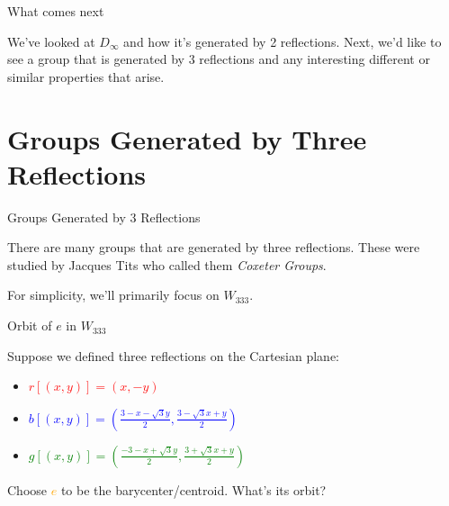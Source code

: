 \documentclass[usenames,dvipsnames]{beamer}
\begin{document}
\begin{frame}{What comes next}

We've looked at $D_\infty$ and how it's generated by 2 reflections. Next, we'd like to see a group that is
generated by 3 reflections and any interesting different or similar properties that arise.

\end{frame}


\section{Groups Generated by Three Reflections}

\begin{frame}{Groups Generated by 3 Reflections}

There are many groups that are generated by three reflections. These were studied by Jacques Tits who called them \textit{Coxeter Groups}. 

For simplicity, we'll primarily focus on $W_{333}$. 

\end{frame}

\begin{frame}{Orbit of $e$ in $W_{333}$}

Suppose we defined three reflections on the Cartesian plane:

\begin{itemize}
  \item \textcolor{red}{$r[(x,y)]=(x,-y)$}
  \item \textcolor{blue}{$b[(x,y)]=(\frac{3-x-\sqrt{3}y}{2},\frac{3-\sqrt{3}x+y}{2})$}
  \item \textcolor{green}{$g[(x,y)]=(\frac{-3-x+\sqrt{3}y}{2},\frac{3+\sqrt{3}x+y}{2})$}
\end{itemize}

Choose \textcolor{orange}{$e$} to be the barycenter/centroid. What's its orbit?

\end{frame}
\end{document}
